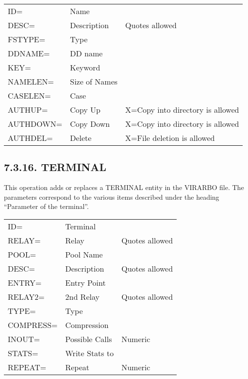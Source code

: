 \documentclass[letterpaper,10pt,english]{sphinxmanual}
\begin{document}
\begin{savenotes}\sphinxattablestart
\centering
\begin{tabulary}{\linewidth}[t]{|T|T|T|}
\hline
{}\relax &\relax &\relax \\
\hline
ID=
&
Name
&\\
\hline
DESC=
&
Description
&
Quotes allowed
\\
\hline
FSTYPE=
&
Type
&\\
\hline
DDNAME=
&
DD name
&\\
\hline
KEY=
&
Keyword
&\\
\hline
NAMELEN=
&
Size of Names
&\\
\hline
CASELEN=
&
Case
&\\
\hline
AUTHUP=
&
Copy Up
&
X=Copy into directory is allowed
\\
\hline
AUTHDOWN=
&
Copy Down
&
X=Copy into directory is allowed
\\
\hline
AUTHDEL=
&
Delete
&
X=File deletion is allowed
\\
\hline
\end{tabulary}
\par
\sphinxattableend\end{savenotes}


\subsection{7.3.16. TERMINAL}
\label{\detokenize{Installation_Guide:terminal}}
This operation adds or replaces a TERMINAL entity in the VIRARBO file. The parameters correspond to the various items described under the heading “Parameter of the terminal”.


\begin{savenotes}\sphinxattablestart
\centering
\begin{tabulary}{\linewidth}[t]{|T|T|T|}
\hline
{}\relax &\relax &\relax \\
\hline
ID=
&
Terminal
&\\
\hline
RELAY=
&
Relay
&
Quotes allowed
\\
\hline
POOL=
&
Pool Name
&\\
\hline
DESC=
&
Description
&
Quotes allowed
\\
\hline
ENTRY=
&
Entry Point
&\\
\hline
RELAY2=
&
2nd Relay
&
Quotes allowed
\\
\hline
TYPE=
&
Type
&\\
\hline
COMPRESS=
&
Compression
&\\
\hline
INOUT=
&
Possible Calls
&
Numeric
\\
\hline
STATS=
&
Write Stats to
&\\
\hline
REPEAT=
&
Repeat
&
Numeric
\\
\hline
\end{tabulary}
\par
\sphinxattableend\end{savenotes}
\end{document}
